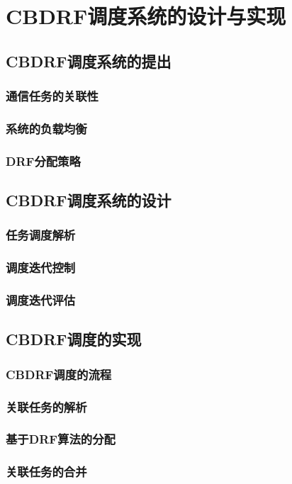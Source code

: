 \chapter{CBDRF调度系统的设计与实现}
\label{cha:frontmatter}
\section{CBDRF调度系统的提出}
\subsection{通信任务的关联性}
\subsection{系统的负载均衡}
\subsection{DRF分配策略}
\section{CBDRF调度系统的设计}
\subsection{任务调度解析}
\subsection{调度迭代控制}
\subsection{调度迭代评估}
\section{CBDRF调度的实现}
\subsection{CBDRF调度的流程}
\subsection{关联任务的解析}
\subsection{基于DRF算法的分配}
\subsection{关联任务的合并}
